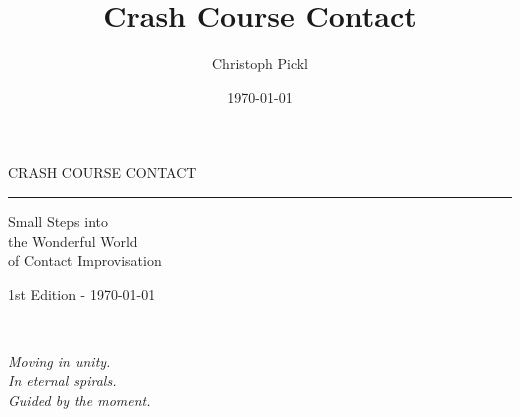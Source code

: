 \documentclass[a5paper,11pt]{book}
\title{Crash Course Contact}
\date{\today}
\author{Christoph Pickl}
\begin{document}
\begin{titlepage}
\begin{center}
	
	\vspace*{\fill}
	
	\fontsize{22}{0}\selectfont
    {\sffamily CRASH COURSE CONTACT}
	\vskip 5mm
	\rule{84mm}{0.4pt}
	\vskip 1mm
	\fontsize{15}{22}\selectfont
	{\sffamily Small Steps into \\ the Wonderful World \\ of Contact Improvisation}
	
	\vskip 70mm
	
	\vspace*{\fill}

	\fontsize{9}{0}\selectfont
	{\sffamily 1st Edition - \today}
\end{center}
\end{titlepage}

\pagestyle{empty}
\tableofcontents
\clearpage
\ifodd\value{page}\else
  \thispagestyle{empty}
\fi

\pagestyle{fancy}

~

\vfill
\begin{center}
	\textit{Moving in unity.}\\
	\textit{In eternal spirals.}\\
	\textit{Guided by the moment.}
\end{center}
\vfill
\newpage
















\printglossaries
\end{document}
